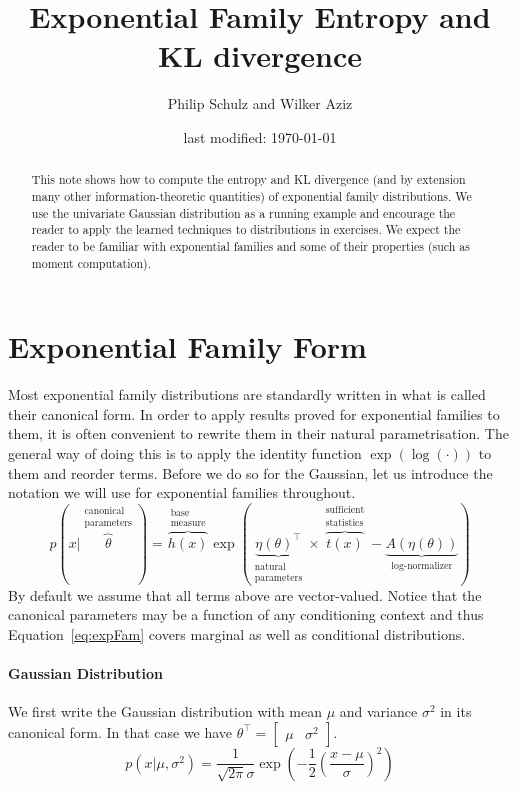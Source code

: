 \documentclass[a4paper, 11pt]{article}
\author{Philip Schulz and Wilker Aziz}
\title{Exponential Family Entropy and KL divergence}
\date{last modified: \today}
\begin{document}
\maketitle

\begin{abstract}
This note shows how to compute the entropy and KL divergence (and by extension many other information-theoretic quantities) of 
exponential family distributions. We use the univariate Gaussian distribution as a running example and encourage the reader to
apply the learned techniques to distributions in exercises. We expect the reader to be familiar with exponential families 
and some of their properties (such as moment computation).
\end{abstract}

\section{Exponential Family Form}

Most exponential family distributions are standardly written in what is called their canonical form. 
In order to apply results proved for 
exponential families to them, it is often convenient to rewrite them in their natural parametrisation. The general way of doing
this is to apply the identity function $ \exp(\log(\cdot)) $ to them and reorder terms. Before we do so for the Gaussian, let us
introduce the notation we will use for exponential families throughout.
\begin{equation} \label{eq:expFam}
p(x|\overbrace{\theta}^{\substack{\text{canonical} \\ \text{parameters}}}) = \overbrace{h(x)}^{\substack{\text{base} \\ \text{measure}}} \exp\left( \underbrace{\eta(\theta)^{\top}}_{\substack{\text{natural} \\ \text{parameters}}} \times \overbrace{t(x)}^{\substack{\text{sufficient} \\ \text{statistics}}}  -\underbrace{A(\eta(\theta))}_{\text{log-normalizer}} \right)
\end{equation}
By default we assume that all terms above are vector-valued. Notice that the canonical parameters may be a function of any conditioning
context and thus Equation~\eqref{eq:expFam} covers marginal as well as conditional distributions.

\paragraph{Gaussian Distribution} We first write the Gaussian distribution with mean $ \mu $ and variance $ \sigma^{2} $ in its 
canonical form. In that case we have $ \theta^{\top} = \begin{bmatrix} \mu & \sigma^{2} \end{bmatrix} $.
\begin{equation}\label{eq:canonicalGaussian}
p(x|\mu, \sigma^{2}) = \frac{1}{\sqrt{2\pi}\sigma} \exp \left(-\frac{1}{2}\left(\frac{x - \mu}{\sigma}\right)^{2}\right)
\end{equation}
\end{document}
